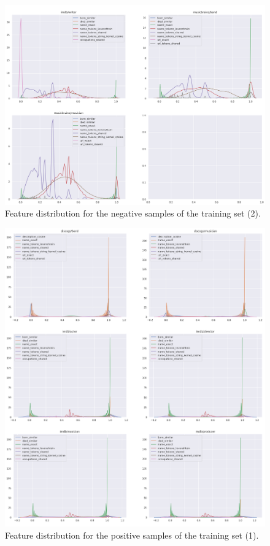\documentclass[epsfig,a4paper,11pt,titlepage,twoside,openany]{book}
\begin{document}
\begin{figure}[H]
      \centering
      \includegraphics[width=\linewidth]{features_distribution_negative_samples_2}
      \caption{Feature distribution for the negative samples of the training set (2).}
      \label{fig:distribution-of-training-negative-features-2}
\end{figure}



\begin{figure}[H]
      \centering
      \includegraphics[width=\linewidth]{features_distribution_positive_samples_1}
      \caption{Feature distribution for the positive samples of the training set (1).}
      \label{fig:distribution-of-training-positive-features-1}
\end{figure}
\end{document}
